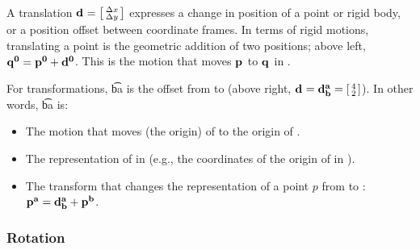 \documentclass{16384_doc}
\begin{document}
A translation $\mathbf{d_{}^{}} = \left[\begin{smallmatrix}\Delta x\\\Delta y\end{smallmatrix}\right]$ expresses a change in
position of a point or rigid body, or a position offset between coordinate
frames. In terms of rigid motions, translating a point is the geometric addition of two
positions; above left, $\mathbf{q_{}^{0}} = \mathbf{p_{}^{0}} + \mathbf{d_{}^{0}}$. This is the motion
that moves $\mathbf{p_{}^{}}$ to $\mathbf{q_{}^{}}$ in .

For transformations, \t{b}{a} is the offset from  to  (above
right, $\mathbf{d_{}^{}} = \mathbf{d_{b}^{a}} = \left[\begin{smallmatrix}4\\2\end{smallmatrix}\right]$). In other words, \t{b}{a} is:
\begin{itemize}
  \item The motion that moves (the origin) of  to the origin of
    .
  \item The representation of  in  (e.g., the coordinates of
    the origin of  in ).
  \item The transform that changes the representation of a point $p$ from
     to : $\mathbf{p_{}^{a}} = \mathbf{d_{b}^{a}} + \mathbf{p_{}^{b}}$.
\end{itemize}

\subsubsection{Rotation}
\end{document}
